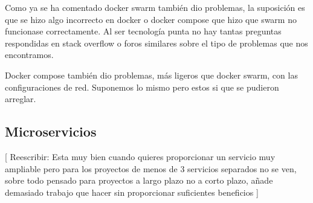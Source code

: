 Como ya se ha comentado docker swarm también dio problemas, la suposición es que se hizo algo incorrecto en docker o docker compose que hizo que swarm no funcionase correctamente. Al ser tecnología punta no hay tantas preguntas respondidas en stack overflow o foros similares sobre el tipo de problemas que nos encontramos.

Docker compose también dio problemas, más ligeros que docker swarm, con las configuraciones de red.
Suponemos lo mismo pero estos si que se pudieron arreglar.


\subsection{Microservicios}

[ Reescribir: Esta muy bien cuando quieres proporcionar un servicio muy ampliable pero para los proyectos de menos de 3 servicios separados no se ven, sobre todo pensado para proyectos a largo plazo no a corto plazo, añade demasiado trabajo que hacer sin proporcionar suficientes beneficios ]
